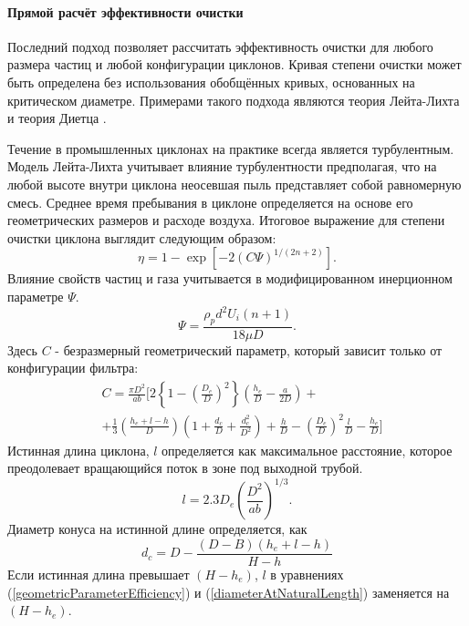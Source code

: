 			\paragraph{Прямой расчёт эффективности очистки\\}

			Последний подход позволяет рассчитать эффективность очистки для любого размера частиц и любой конфигурации циклонов. Кривая степени очистки может быть определена без использования обобщённых кривых, основанных на критическом диаметре. Примерами такого подхода являются теория Лейта-Лихта \cite{LeithLicht} и теория Диетца \cite{Dietz}.
			
			Течение в промышленных циклонах на практике всегда является турбулентным. Модель Лейта-Лихта учитывает влияние турбулентности предполагая, что на любой высоте внутри циклона неосевшая пыль представляет собой равномерную смесь. Среднее время пребывания в циклоне определяется на основе его геометрических размеров и расходе воздуха. Итоговое выражение для степени очистки циклона выглядит следующим образом:
			\begin{equation}
				\eta = 1 - \exp[-2 (C\Psi)^{1/(2n+2)}].
			\end{equation}
			Влияние свойств частиц и газа учитывается в модифицированном инерционном параметре $\Psi$.
			\begin{equation}
				\Psi = \frac{\rho_p d^2 U_i (n+1)}{18 \mu D}.
			\end{equation}
			Здесь $C$ - безразмерный геометрический параметр, который зависит только от конфигурации фильтра:
			\begin{equation}
				\begin{aligned}
					\label{geometricParameterEfficiency}
					&C = \frac{\pi D^2}{ab} \Bigg[ 2 \left\lbrace 1 - \left( \frac{D_e}{D}\right)^2 \right\rbrace\left( \frac{h_e}{D} - \frac{a}{2D} \right) + \\ &+ \frac{1}{3} \left( \frac{h_e + l - h}{D} \right)\left( 1+\frac{d_c}{D} + \frac{d_c^2}{D^2}  \right) + \frac{h}{D} - \left( \frac{D_e}{D} \right)^2\frac{l}{D} - \frac{h_e}{D}\Bigg]			
				\end{aligned}
			\end{equation}
			Истинная длина циклона, $l$ определяется как максимальное расстояние, которое преодолевает вращающийся поток в зоне под выходной трубой. 
			\begin{equation}
				\label{naturalLength}
				l = 2.3D_e\left(\frac{D^2}{ab}\right)^{1/3}.
			\end{equation}
			Диаметр конуса на истинной длине определяется, как
			\begin{equation}
			\label{diameterAtNaturalLength}
				d_c = D - \frac{(D-B)(h_e + l -h)}{H - h}
			\end{equation}
			Если истинная длина превышает $(H-h_e)$, $l$ в уравнениях (\ref{geometricParameterEfficiency}) и (\ref{diameterAtNaturalLength}) заменяется на $(H - h_e)$.
			
